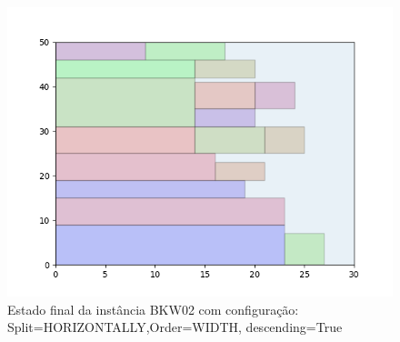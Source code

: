 \begin{figure}[H]
    \centering
    \caption[]{Estado final da instância BKW02 com configuração: Split=HORIZONTALLY,Order=WIDTH, descending=True}
    \label{fig:bkw02-horizontally-width-true}
    \includegraphics[scale=0.5]{output/figures/bkw/bkw02/horizontally/width/true/00}
\end{figure}